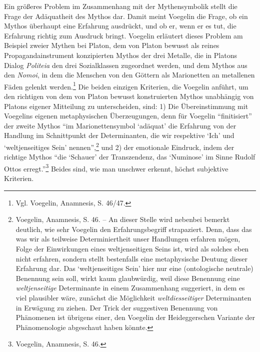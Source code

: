 Ein größeres Problem im Zusammenhang mit der Mythensymbolik stellt die Frage
der Adäquatheit des Mythos dar. Damit meint Voegelin die Frage, ob ein Mythos
überhaupt eine Erfahrung ausdrückt, und ob er, wenn er es tut, die Erfahrung
richtig zum Ausdruck bringt. Voegelin erläutert dieses Problem am Beispiel
zweier Mythen bei Platon, dem von Platon bewusst als reines
Propagandainstrument konzipierten Mythos der drei Metalle, die in Platons
Dialog {\em Politeia} den drei Sozialklassen zugeordnet werden, und dem Mythos
aus den {\em Nomoi}, in dem die Menschen von den Göttern als Marionetten an
metallenen Fäden gelenkt werden.\footnote{Vgl. Voegelin, Anamnesis, S. 46/47.}
Die beiden einzigen Kriterien, die Voegelin anführt, um den richtigen von dem
von Platon bewusst konstruierten Mythos unabhängig von Platons eigener
Mitteilung zu unterscheiden, sind: 1) Die Übereinstimmung mit Voegelins eigenen
metaphysischen Überzeugungen, denn für Voegelin "`finitisiert"' der zweite
Mythos "`im Marionettensymbol `adäquat' die Erfahrung von der Handlung im
Schnittpunkt der Determinanten, die wir respektive `Ich' und `weltjenseitiges
Sein' nennen"',\footnote{Voegelin, Anamnesis, S. 46. -- An dieser Stelle wird
  nebenbei bemerkt deutlich, wie sehr Voegelin den Erfahrungsbegriff
  strapaziert. Denn, dass das was wir als teilweise Determiniertheit unser
  Handlungen erfahren mögen, Folge der Einwirkungen eines weltjenseitigen
  Seins ist, wird als solches eben nicht erfahren, sondern stellt bestenfalls
  eine metaphysische Deutung dieser Erfahrung dar. Das `weltjenseitiges Sein'
  hier nur eine (ontologische neutrale) Benennung sein soll, wirkt kaum
  glaubwürdig, weil diese Benennung eine {\em weltjenseitige} Determinante in
  einem Zusammenhang suggeriert, in dem es viel plausibler wäre, zunächst die
  Möglichkeit {\em weltdiesseitiger} Determinanten in Erwägung zu ziehen. Der
  Trick der suggestiven Benennung von Phänomenen ist übrigens einer, den
  Voegelin der Heideggerschen Variante der Phänomenologie abgeschaut haben
  könnte.} und 2) der emotionale Eindruck, indem der richtige Mythos "`die
`Schauer' der Transzendenz, das `Numinose' im Sinne Rudolf Ottos
erregt."'\footnote{Voegelin, Anamnesis, S.  46.} Beides sind, wie man unschwer
erkennt, höchst subjektive Kriterien.

